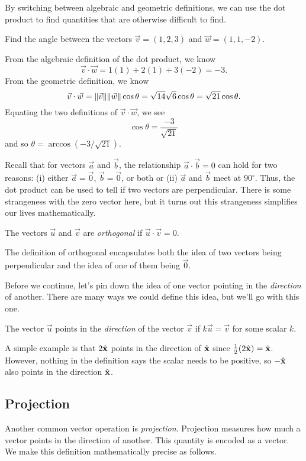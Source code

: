 By switching between algebraic and geometric definitions, we can use the dot
product to find quantities that are otherwise difficult to find.
\begin{example}
	Find the angle between the vectors $\vec v=(1,2,3)$ and $\vec w=(1,1,-2)$.

	From the algebraic definition of the dot product, we know
	\[
		\vec v\cdot \vec w = 1(1)+2(1)+3(-2) = -3.
	\]
	From the geometric definition, we know
	\[
		\vec v\cdot \vec w=\lVert\vec v\rVert\lVert\vec w\rVert\cos\theta
		=\sqrt{14}\sqrt{6}\cos\theta=\sqrt{21}\cos\theta.
	\]
	Equating the two definitions of $\vec v\cdot \vec w$, we see
	\[
		\cos\theta = \frac{-3}{\sqrt{21}}
	\]
	and so $\theta=\arccos(-3/\sqrt{21})$.
\end{example}

Recall that for vectors $\vec a$ and $\vec b$, the relationship $\vec a\cdot \vec b=0$
can hold for two reasons: (i) either $\vec a=\vec 0$, $\vec b=\vec 0$, or both
or (ii) $\vec a$ and $\vec b$ meet at $90^{\circ}$.  Thus, the dot product
can be used to tell if two vectors are perpendicular.  There is some strangeness
with the zero vector here, but it turns out this strangeness simplifies our lives
mathematically.

\begin{definition}[Orthogonal]
	The vectors $\vec u$ and $\vec v$ are \emph{orthogonal}
	if $\vec u\cdot\vec v=0$.
\end{definition}

The definition of orthogonal encapsulates both the idea of two vectors being
perpendicular and the idea of one of them being $\vec 0$.

Before we continue, let's pin down the idea of one vector pointing
in the \emph{direction} of another.  There are many ways we could define
this idea, but we'll go with this one.

\begin{definition}
	The vector $\vec u$ points in the \emph{direction} of
	the vector $\vec v$ if $k\vec u=\vec v$ for some scalar $k$.
\end{definition}

A simple example is that $2{\hat {\mathbf x}}$ points in the direction of ${\hat {\mathbf x}}$ since 
$\frac{1}{2}(2{\hat {\mathbf x}})={\hat {\mathbf x}}$.  However, nothing in the definition says the
scalar needs to be positive, so $-{\hat {\mathbf x}}$ also points in the direction ${\hat {\mathbf x}}$.

\subsection{Projection}
Another common vector operation is \emph{projection}.
Projection measures how much a vector points in the direction
of another.  This quantity is encoded as a vector.  We make this
definition mathematically precise as follows.

